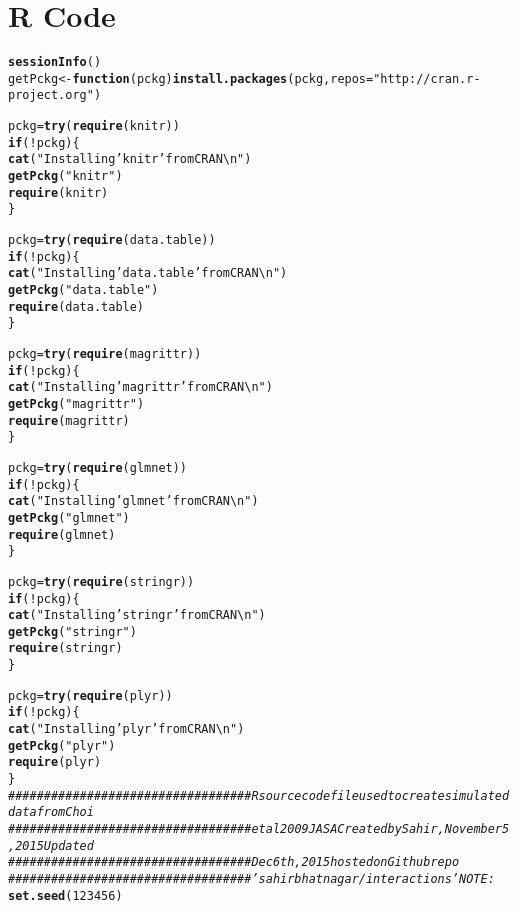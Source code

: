 \documentclass[11pt,letter]{article}\usepackage[]{graphicx}\usepackage[]{color}
\makeatletter
\newcommand{\hlnum}[1]{\textcolor[rgb]{0.686,0.059,0.569}{#1}}%
\newcommand{\hlstr}[1]{\textcolor[rgb]{0.192,0.494,0.8}{#1}}%
\newcommand{\hlcom}[1]{\textcolor[rgb]{0.678,0.584,0.686}{\textit{#1}}}%
\newcommand{\hlopt}[1]{\textcolor[rgb]{0,0,0}{#1}}%
\newcommand{\hlstd}[1]{\textcolor[rgb]{0.345,0.345,0.345}{#1}}%
\newcommand{\hlkwa}[1]{\textcolor[rgb]{0.161,0.373,0.58}{\textbf{#1}}}%
\newcommand{\hlkwb}[1]{\textcolor[rgb]{0.69,0.353,0.396}{#1}}%
\newcommand{\hlkwc}[1]{\textcolor[rgb]{0.333,0.667,0.333}{#1}}%
\newcommand{\hlkwd}[1]{\textcolor[rgb]{0.737,0.353,0.396}{\textbf{#1}}}%
\newenvironment{kframe}{%
 \def\at@end@of@kframe{}%
 \ifinner\ifhmode%
  \def\at@end@of@kframe{\end{minipage}}%
  \begin{minipage}{\columnwidth}%
 \fi\fi%
 \def\FrameCommand##1{\hskip\@totalleftmargin \hskip-\fboxsep
 \colorbox{shadecolor}{##1}\hskip-\fboxsep
     \hskip-\linewidth \hskip-\@totalleftmargin \hskip\columnwidth}%
 \MakeFramed {\advance\hsize-\width
   \@totalleftmargin\z@ \linewidth\hsize
   \@setminipage}}%
 {\par\unskip\endMakeFramed%
 \at@end@of@kframe}
\newenvironment{knitrout}{}{} %
\makeatother
\begin{document}
\section{R Code}
\begin{knitrout}
\color{fgcolor}\begin{kframe}
\begin{alltt}
\hlkwd{sessionInfo}\hlstd{()}
\hlstd{getPckg} \hlkwb{<-} \hlkwa{function}\hlstd{(}\hlkwc{pckg}\hlstd{)} \hlkwd{install.packages}\hlstd{(pckg,} \hlkwc{repos} \hlstd{=} \hlstr{"http://cran.r-project.org"}\hlstd{)}

\hlstd{pckg} \hlkwb{=} \hlkwd{try}\hlstd{(}\hlkwd{require}\hlstd{(knitr))}
\hlkwa{if} \hlstd{(}\hlopt{!}\hlstd{pckg) \{}
    \hlkwd{cat}\hlstd{(}\hlstr{"Installing 'knitr' from CRAN\textbackslash{}n"}\hlstd{)}
    \hlkwd{getPckg}\hlstd{(}\hlstr{"knitr"}\hlstd{)}
    \hlkwd{require}\hlstd{(knitr)}
\hlstd{\}}

\hlstd{pckg} \hlkwb{=} \hlkwd{try}\hlstd{(}\hlkwd{require}\hlstd{(data.table))}
\hlkwa{if} \hlstd{(}\hlopt{!}\hlstd{pckg) \{}
    \hlkwd{cat}\hlstd{(}\hlstr{"Installing 'data.table' from CRAN\textbackslash{}n"}\hlstd{)}
    \hlkwd{getPckg}\hlstd{(}\hlstr{"data.table"}\hlstd{)}
    \hlkwd{require}\hlstd{(data.table)}
\hlstd{\}}

\hlstd{pckg} \hlkwb{=} \hlkwd{try}\hlstd{(}\hlkwd{require}\hlstd{(magrittr))}
\hlkwa{if} \hlstd{(}\hlopt{!}\hlstd{pckg) \{}
    \hlkwd{cat}\hlstd{(}\hlstr{"Installing 'magrittr' from CRAN\textbackslash{}n"}\hlstd{)}
    \hlkwd{getPckg}\hlstd{(}\hlstr{"magrittr"}\hlstd{)}
    \hlkwd{require}\hlstd{(magrittr)}
\hlstd{\}}

\hlstd{pckg} \hlkwb{=} \hlkwd{try}\hlstd{(}\hlkwd{require}\hlstd{(glmnet))}
\hlkwa{if} \hlstd{(}\hlopt{!}\hlstd{pckg) \{}
    \hlkwd{cat}\hlstd{(}\hlstr{"Installing 'glmnet' from CRAN\textbackslash{}n"}\hlstd{)}
    \hlkwd{getPckg}\hlstd{(}\hlstr{"glmnet"}\hlstd{)}
    \hlkwd{require}\hlstd{(glmnet)}
\hlstd{\}}

\hlstd{pckg} \hlkwb{=} \hlkwd{try}\hlstd{(}\hlkwd{require}\hlstd{(stringr))}
\hlkwa{if} \hlstd{(}\hlopt{!}\hlstd{pckg) \{}
    \hlkwd{cat}\hlstd{(}\hlstr{"Installing 'stringr' from CRAN\textbackslash{}n"}\hlstd{)}
    \hlkwd{getPckg}\hlstd{(}\hlstr{"stringr"}\hlstd{)}
    \hlkwd{require}\hlstd{(stringr)}
\hlstd{\}}

\hlstd{pckg} \hlkwb{=} \hlkwd{try}\hlstd{(}\hlkwd{require}\hlstd{(plyr))}
\hlkwa{if} \hlstd{(}\hlopt{!}\hlstd{pckg) \{}
    \hlkwd{cat}\hlstd{(}\hlstr{"Installing 'plyr' from CRAN\textbackslash{}n"}\hlstd{)}
    \hlkwd{getPckg}\hlstd{(}\hlstr{"plyr"}\hlstd{)}
    \hlkwd{require}\hlstd{(plyr)}
\hlstd{\}}
\hlcom{################################## R source code file used to create simulated data from Choi}
\hlcom{################################## et al 2009 JASA Created by Sahir, November 5, 2015 Updated}
\hlcom{################################## Dec 6th, 2015 hosted on Github repo}
\hlcom{################################## 'sahirbhatnagar/interactions' NOTE:}
\hlkwd{set.seed}\hlstd{(}\hlnum{123456}\hlstd{)}


\end{alltt}
\end{kframe}
\end{knitrout}
\end{document}

